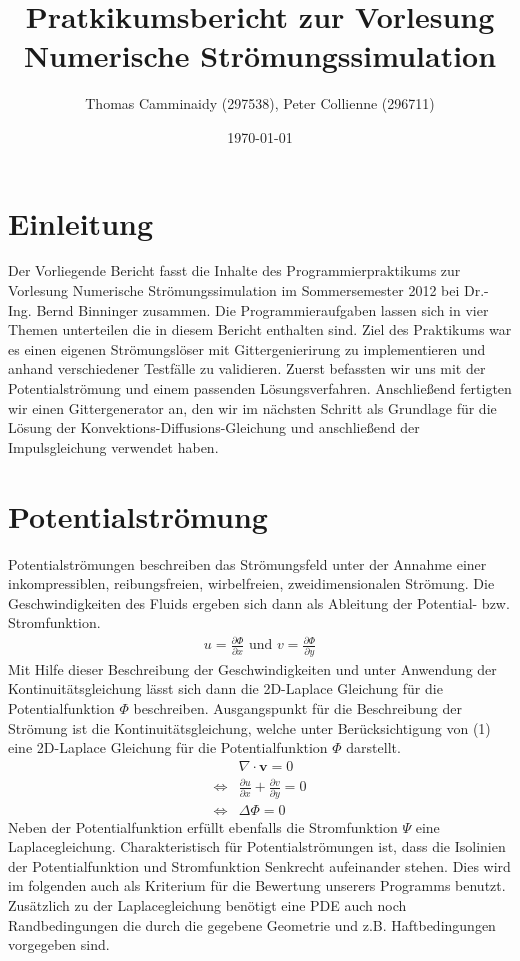 \documentclass{article}
\begin{document}
\title{Pratkikumsbericht zur Vorlesung \\Numerische Strömungssimulation}
\author{Thomas Camminaidy (297538), Peter Collienne (296711)}
\date{\today}
\maketitle \newpage

\tableofcontents \newpage


\section{Einleitung}
Der Vorliegende Bericht fasst die Inhalte des Programmierpraktikums zur Vorlesung Numerische Strömungssimulation 
im Sommersemester 2012 bei Dr.-Ing. Bernd Binninger zusammen. Die
Programmieraufgaben lassen sich in vier Themen unterteilen die in diesem Bericht enthalten sind. Ziel des Praktikums war es einen eigenen Strömungslöser mit Gittergenierirung zu implementieren und anhand verschiedener Testfälle zu validieren.
Zuerst befassten wir uns mit der Potentialströmung und einem passenden Lösungsverfahren. Anschließend fertigten wir einen 
Gittergenerator an, den wir im nächsten Schritt als Grundlage für die Lösung der Konvektions-Diffusions-Gleichung 
und anschließend der Impulsgleichung verwendet haben.


\section{Potentialströmung}
Potentialströmungen beschreiben das Strömungsfeld unter der Annahme einer inkompressiblen, reibungsfreien, wirbelfreien, zweidimensionalen
Strömung. Die Geschwindigkeiten des Fluids ergeben sich dann als Ableitung der Potential- bzw. Stromfunktion.
\begin{align} u =\frac{ \partial \Phi} {\partial x} \text{ und } v =\frac{ \partial \Phi} {\partial y}\end{align}
Mit Hilfe dieser Beschreibung der Geschwindigkeiten und unter Anwendung der Kontinuitätsgleichung 
lässt sich dann die 
2D-Laplace Gleichung für die Potentialfunktion $\Phi$ beschreiben.
Ausgangspunkt für die Beschreibung der Strömung ist die Kontinuitätsgleichung, welche unter Berücksichtigung von (1) eine 2D-Laplace Gleichung für die 
Potentialfunktion $\Phi$ darstellt.
\begin{align} &\nabla \cdot \mathbf{v} =0 \\ \Leftrightarrow &\frac{ \partial u} {\partial x}+ \frac{ \partial v} {\partial y}=0
\\ \Leftrightarrow &\Delta \Phi = 0 \end{align}
Neben der Potentialfunktion erfüllt ebenfalls die Stromfunktion $\Psi$ eine Laplacegleichung. Charakteristisch für Potentialströmungen
ist, dass die Isolinien der Potentialfunktion und Stromfunktion Senkrecht aufeinander stehen. Dies wird im folgenden auch als Kriterium für die
Bewertung unserers Programms benutzt. Zusätzlich zu der Laplacegleichung benötigt eine PDE auch noch Randbedingungen die durch die gegebene Geometrie
und z.B. Haftbedingungen vorgegeben sind.
\end{document}
